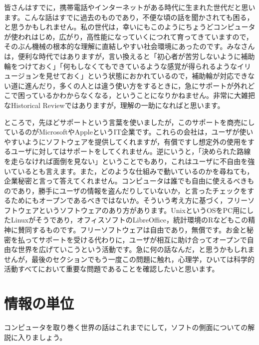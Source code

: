 \documentclass{ltjsbook}
\begin{document}
皆さんはすでに，携帯電話やインターネットがある時代に生まれた世代だと思います。こんな話はすでに過去のものであり，不便な頃の話を聞かされても困る，と思うかもしれません。私の世代は，幸いにもこのようにちょうどコンピュータが使われはじめ，広がり，高性能になっていくにつれて育ってきていますので，そのぶん機械の根本的な理解に直結しやすい社会環境にあったのです。みなさんは，便利な時代ではありますが，言い換えると「初心者が苦労しないように補助輪をつけておく」「何もしなくてもできているような感覚が得られるようなイリュージョンを見せておく」という状態におかれているので，補助輪が対応できない道に進んだり，多くの人とは違う使い方をするときに，急にサポートが外れどこで困っているかわからなくなる，ということになりかねません。非常に大雑把なHistorical Reviewではありますが，理解の一助になればと思います。

ところで，先ほどサポートという言葉を使いましたが，このサポートを商売にしているのがMicrosoftやAppleというIT企業です。これらの会社は，ユーザが使いやすいようにソフトウェアを提供してくれますが，有償ですし想定外の使用をするユーザに対してはサポートをしてくれません。逆にいうと，「決められた路線を走らなければ面倒を見ない」ということでもあり，これはユーザに不自由を強いているとも言えます。また，どのような仕組みで動いているのかを尋ねても，企業秘密と言って答えてくれません。コンピュータは誰でも自由に使えるべきものであり，勝手にユーザの情報を盗んだりしていないか，と言ったチェックをするためにもオープンであるべきではないか。そういう考え方に基づく，フリーソフトウェアというソフトウェアのあり方があります。UnixというOSをPC用にしたLinuxがそうであり，オフィスソフトのLibreOffice，統計環境のRなどもこの精神に賛同するものです。フリーソフトウェアは自由であり，無償です。お金と秘密を払ってサポートを受ける代わりに，ユーザが相互に助け合ってオープンで自由な世界を広げていこうという活動です。急に何の話なんだ，と思うかもしれませんが，最後のセクションでもう一度この問題に触れ，心理学，ひいては科学的活動すべてにおいて重要な問題であることを確認したいと思います。

\section{情報の単位}
コンピュータを取り巻く世界の話はこれまでにして，ソフトの側面についての解説に入りましょう。
\end{document}
